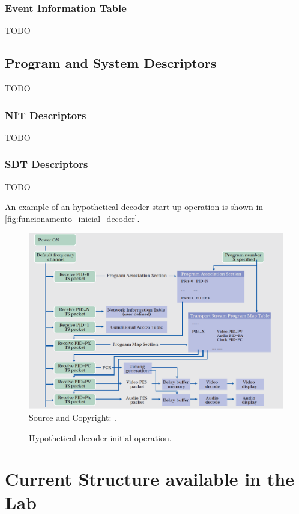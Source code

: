 \documentclass[
	12pt,				%
	openright,			%
	twoside,			%
	a4paper,			%
	brazil,
	french,				%
	english
	]{abntex2}
\begin{document}
\subsection{Event Information Table}
\label{EIT}
TODO

\section{Program and System Descriptors}
\label{descriptors}
TODO 

\subsection{NIT Descriptors}
\label{nit_descriptors}
TODO

\subsection{SDT Descriptors}
\label{nit_descriptors}
TODO

An example of an hypothetical decoder start-up operation is shown in \autoref{fig:funcionamento_inicial_decoder}.

\begin{figure}[!hb]
\centering
\caption{Hypothetical decoder initial operation.}
\includegraphics[width=0.8\linewidth]{figuras/funcionamento_inicial_decoder.png}
\\Source and Copyright: \cite{nhk}.
\label{fig:funcionamento_inicial_decoder}
\end{figure}


\chapter{Current Structure available in the Lab}
\end{document}

